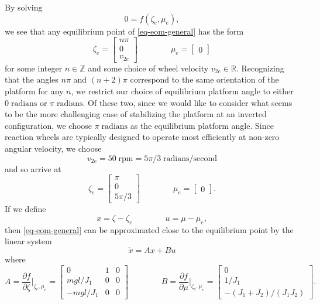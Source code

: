 \documentclass[conf]{new-aiaa}
\begin{document}
By solving
\begin{equation}
0 = f(\zeta_{e}, \mu_{e}),
\end{equation}
we see that any equilibrium point of \eqref{eq-eom-general} has the form
\begin{equation}
\zeta_{e} = \begin{bmatrix} n\pi \\ 0 \\ v_{2e} \end{bmatrix}
\qquad\qquad
\mu_{e} = \begin{bmatrix} 0 \end{bmatrix}
\end{equation}
for some integer $n \in \mathbb{Z}$ and some choice of wheel velocity $v_{2e} \in \mathbb{R}$. Recognizing that the angles $n\pi$ and $(n+2)\pi$ correspond to the same orientation of the platform for any $n$, we restrict our choice of equilibrium platform angle to either $0\;\text{radians}$ or $\pi\;\text{radians}$. Of these two, since we would like to consider what seems to be the more challenging case of stabilizing the platform at an inverted configuration, we choose $\pi\;\text{radians}$ as the equilibrium platform angle. Since reaction wheels are typically designed to operate most efficiently at non-zero angular velocity, we choose
\begin{equation}
v_{2e} = 50\;\text{rpm} = 5\pi/3\;\text{radians}/\text{second}
\end{equation}
and so arrive at
\begin{equation}
\zeta_{e} = \begin{bmatrix} \pi \\ 0 \\ 5\pi/3 \end{bmatrix}
\qquad\qquad
\mu_{e} = \begin{bmatrix} 0 \end{bmatrix}.
\end{equation}
If we define
\begin{equation}
x = \zeta - \zeta_{e}
\qquad\qquad
u = \mu - \mu_{e},
\end{equation}
then \eqref{eq-eom-general} can be approximated close to the equilibrium point by the linear system
\begin{equation}
\dot{x} = Ax+Bu
\label{eq-ss}
\end{equation}
where
\begin{equation}
A
= \frac{\partial f}{\partial \zeta}\biggr\rvert_{\zeta_{e}, \mu_{e}}
= \begin{bmatrix} 0 & 1 & 0 \\ mgl/J_{1} & 0 & 0 \\ -mgl/J_{1} & 0 & 0 \end{bmatrix}
\qquad\qquad
B
= \frac{\partial f}{\partial \mu}\biggr\rvert_{\zeta_{e}, \mu_{e}}
= \begin{bmatrix} 0 \\ 1/J_{1} \\ -(J_{1} + J_{2}) / (J_{1}J_{2}) \end{bmatrix}.
\end{equation}
\end{document}
